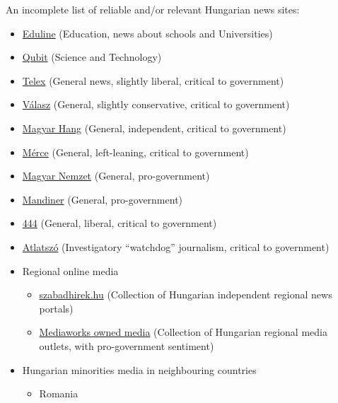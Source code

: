 \documentclass{article}
\begin{document}
An incomplete list of reliable and/or relevant Hungarian news sites:
\begin{itemize}
    \item \href{https://eduline.hu/}{Eduline} (Education, news about schools and Universities)
    \item \href{https://qubit.hu/}{Qubit} (Science and Technology)
    \item \href{https://telex.hu/}{Telex} (General news, slightly liberal, critical to government)
    \item \href{https://www.valaszonline.hu/}{Válasz} (General, slightly conservative, critical to government)
    \item \href{https://magyarhang.org/}{Magyar Hang} (General, independent, critical to government)
    \item \href{https://merce.hu/}{Mérce} (General, left-leaning, critical to government)
    \item \href{https://magyarnemzet.hu/}{Magyar Nemzet} (General, pro-government)
    \item \href{https://mandiner.hu/}{Mandiner} (General, pro-government)
    \item \href{https://444.hu/}{444} (General, liberal, critical to government)
    \item \href{https://atlatszo.hu/}{Atlatszó} (Investigatory ``watchdog'' journalism, critical to government)
    \item Regional online media
    \begin{itemize}
        \item \href{https://www.szabadhirek.hu/}{szabadhirek.hu} (Collection of Hungarian independent regional news portals)
        \item \href{https://mediaworks.hu/termekeink/}{Mediaworks owned media} (Collection of Hungarian regional media outlets, with pro-government sentiment)
    \end{itemize}
    \item Hungarian minorities media in neighbouring countries
    \begin{itemize}
        \item Romania
        \begin{itemize}

\end{itemize}
\end{itemize}
\end{itemize}
\end{document}
